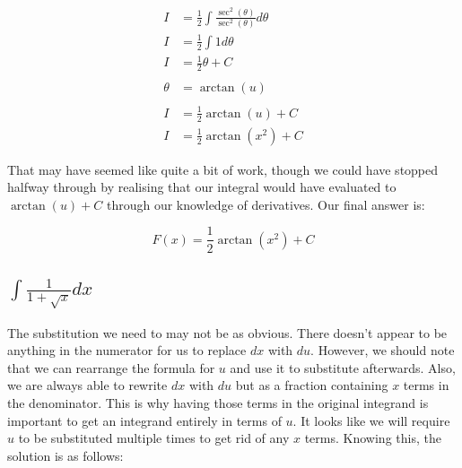 \documentclass[12pt]{article}
\begin{document}
\begin{align}
    I              & = \frac{1}{2} \int \frac{\sec^2(\theta)}{\sec^2(\theta)} d\theta           \\
    I              & = \frac{1}{2} \int 1 d\theta                                               \\
    I              & = \frac{1}{2} \theta + C                                                   \\
    \nonumber                                                                                   \\
    \theta         & = \arctan(u)                                                               \\
    \nonumber                                                                                   \\
    I              & = \frac{1}{2} \arctan(u) + C                                               \\
    I              & = \frac{1}{2} \arctan(x^2) + C
\end{align}


That may have seemed like quite a bit of work, though we could have stopped halfway through by realising that our integral would have evaluated to $\arctan(u) + C$ through our knowledge of derivatives.
Our final answer is:

$$
    F(x) = \frac{1}{2} \arctan(x^2) + C
$$

\subsection{$\int \frac{1}{1+\sqrt{x}} dx$}

The substitution we need to may not be as obvious.
There doesn't appear to be anything in the numerator for us to replace $dx$ with $du$.
However, we should note that we can rearrange the formula for $u$ and use it to substitute afterwards.
Also, we are always able to rewrite $dx$ with $du$ but as a fraction containing $x$ terms in the denominator.
This is why having those terms in the original integrand is important to get an integrand entirely in terms of $u$.
It looks like we will require $u$ to be substituted multiple times to get rid of any $x$ terms.
Knowing this, the solution is as follows:
\end{document}
